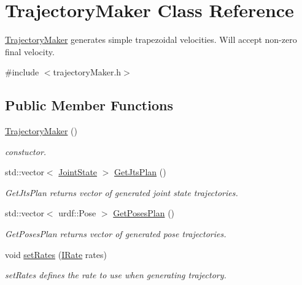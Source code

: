 \hypertarget{classTrajectoryMaker}{\section{Trajectory\-Maker Class Reference}
\label{classTrajectoryMaker}
}


\hyperlink{classTrajectoryMaker}{Trajectory\-Maker} generates simple trapezoidal velocities. Will accept non-\/zero final velocity.  




{\ttfamily \#include $<$trajectory\-Maker.\-h$>$}

\subsection*{Public Member Functions}
\begin{DoxyCompactItemize}
\item 
\hyperlink{classTrajectoryMaker_a6b767e7716eb5366d9b3bf70cf0ba9c6}{Trajectory\-Maker} ()
\begin{DoxyCompactList}\small\item\em constuctor. \end{DoxyCompactList}\item 
std\-::vector$<$ \hyperlink{RCS_8h_aa4adb93a26caa4dacba9c9614e283245}{Joint\-State} $>$ \hyperlink{classTrajectoryMaker_a5ec57242aa15a328e9aaaa200465901f}{Get\-Jts\-Plan} ()
\begin{DoxyCompactList}\small\item\em Get\-Jts\-Plan returns vector of generated joint state trajectories. \end{DoxyCompactList}\item 
std\-::vector$<$ urdf\-::\-Pose $>$ \hyperlink{classTrajectoryMaker_a09bfdcef8912f678e71acc697a27fc22}{Get\-Poses\-Plan} ()
\begin{DoxyCompactList}\small\item\em Get\-Poses\-Plan returns vector of generated pose trajectories. \end{DoxyCompactList}\item 
void \hyperlink{classTrajectoryMaker_ad752eac0a5705cab6620f5c9dad49654}{set\-Rates} (\hyperlink{classIRate}{I\-Rate} rates)
\begin{DoxyCompactList}\small\item\em set\-Rates defines the rate to use when generating trajectory. \end{DoxyCompactList}\item 

\end{DoxyCompactItemize}
